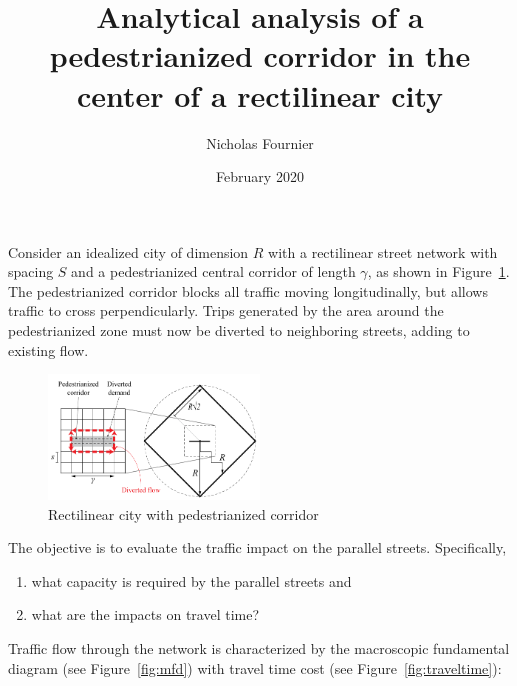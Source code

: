 \documentclass{article}
\title{Analytical analysis of a pedestrianized corridor in the center of a rectilinear city}
\author{Nicholas Fournier}
\date{February 2020}
\begin{document}
\maketitle



Consider an idealized city of dimension $R$ with a rectilinear street network with spacing $S$ and a pedestrianized central corridor of length $\gamma$, as shown in Figure~\ref{fig:gridcity}. The pedestrianized corridor blocks all traffic moving longitudinally, but allows traffic to cross perpendicularly. Trips generated by the area around the pedestrianized zone must now be diverted to neighboring streets, adding to existing flow.

\begin{figure}[!ht]
     \centering
     \includegraphics[width=0.5\textwidth]{diagram_grid_city}
     \caption{Rectilinear city with pedestrianized corridor}
     \label{fig:gridcity}
\end{figure}

\noindent The objective is to evaluate the traffic impact on the parallel streets. Specifically,

\begin{enumerate}[topsep=3pt, itemsep=3pt, partopsep=3pt, parsep=3pt]
    \itshape
    \item what capacity is required by the parallel streets and
    \item what are the impacts on travel time?
\end{enumerate}

\noindent Traffic flow through the network is characterized by the macroscopic fundamental diagram (see Figure~\ref{fig:mfd}) with travel time cost (see Figure~\ref{fig:traveltime}):
\end{document}
